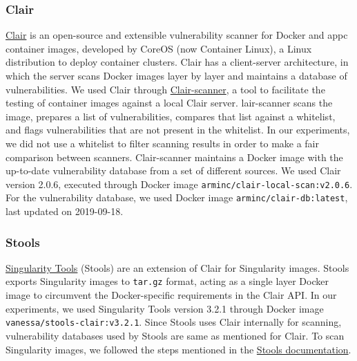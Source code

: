 \subsubsection{Clair}

\href{https://github.com/quay/clair}{Clair} is an open-source and
extensible vulnerability scanner for Docker and appc container images,
developed by CoreOS (now Container Linux), a Linux distribution to deploy
container clusters.
Clair has a client-server architecture, in which the
server scans Docker images layer by layer and maintains a database of
vulnerabilities.
We used Clair through
\href{https://github.com/arminc/clair-scanner}{Clair-scanner}, a tool to
facilitate the testing of container images against a local Clair server.
lair-scanner scans the image,
prepares a list of vulnerabilities, compares that list against a
whitelist, and flags vulnerabilities that are not present in the whitelist.
In our experiments, we did not use a whitelist to filter scanning results in
order to make a fair comparison between scanners.
Clair-scanner maintains a Docker image with the up-to-date vulnerability
database from a set of different sources.
We used Clair version 2.0.6, executed through
Docker image \texttt{arminc/clair-local-scan:v2.0.6}. For the vulnerability
database, we used Docker image \texttt{arminc/clair-db:latest}, last
updated on 2019-09-18.

\subsubsection{Stools}
\href{https://github.com/singularityhub/stools}{Singularity Tools} (Stools)
are an extension of Clair for Singularity images. Stools
exports Singularity images to \texttt{tar.gz} format, acting as a single layer Docker image
to circumvent the Docker-specific requirements in the Clair API.
In our experiments, we used Singularity Tools version 3.2.1 through Docker
image
\texttt{vanessa/stools-clair:v3.2.1}.
Since Stools uses Clair internally for scanning, vulnerability databases used
by Stools are same as mentioned for Clair.
To scan Singularity images, we followed the steps mentioned in the
\href{https://github.com/singularityhub/stools}{Stools documentation}.

